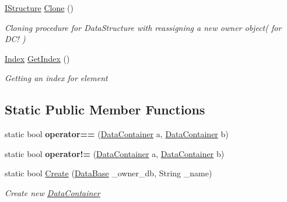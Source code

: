 \begin{DoxyCompactItemize}
\item 
\hyperlink{interface_dwarf_d_b_1_1_data_structures_1_1_i_structure}{I\+Structure} \hyperlink{class_dwarf_d_b_1_1_data_structures_1_1_data_container_a246c00add5642b9674339a0319bae617}{Clone} ()
\begin{DoxyCompactList}\small\item\em Cloning procedure for Data\+Structure with reassigning a new owner object( for D\+C! ) \end{DoxyCompactList}\item 
\hyperlink{class_dwarf_d_b_1_1_data_structures_1_1_index}{Index} \hyperlink{class_dwarf_d_b_1_1_data_structures_1_1_data_container_a195b9a3fcaa91d3240e07164c1d5c460}{Get\+Index} ()
\begin{DoxyCompactList}\small\item\em Getting an index for element \end{DoxyCompactList}\end{DoxyCompactItemize}
\subsection*{Static Public Member Functions}
\begin{DoxyCompactItemize}
\item 
\hypertarget{class_dwarf_d_b_1_1_data_structures_1_1_data_container_a7a47a45e62754b629dc06c57438a4eca}{static bool {\bfseries operator==} (\hyperlink{class_dwarf_d_b_1_1_data_structures_1_1_data_container}{Data\+Container} a, \hyperlink{class_dwarf_d_b_1_1_data_structures_1_1_data_container}{Data\+Container} b)}\label{class_dwarf_d_b_1_1_data_structures_1_1_data_container_a7a47a45e62754b629dc06c57438a4eca}

\item 
\hypertarget{class_dwarf_d_b_1_1_data_structures_1_1_data_container_aa59ee6235912ea37a590efe9a147b704}{static bool {\bfseries operator!=} (\hyperlink{class_dwarf_d_b_1_1_data_structures_1_1_data_container}{Data\+Container} a, \hyperlink{class_dwarf_d_b_1_1_data_structures_1_1_data_container}{Data\+Container} b)}\label{class_dwarf_d_b_1_1_data_structures_1_1_data_container_aa59ee6235912ea37a590efe9a147b704}

\item 
static bool \hyperlink{class_dwarf_d_b_1_1_data_structures_1_1_data_container_a57324435e4d7961b4b875588b9a86f3d}{Create} (\hyperlink{class_dwarf_d_b_1_1_data_structures_1_1_data_base}{Data\+Base} \+\_\+owner\+\_\+db, String \+\_\+name)
\begin{DoxyCompactList}\small\item\em Create new \hyperlink{class_dwarf_d_b_1_1_data_structures_1_1_data_container}{Data\+Container} \end{DoxyCompactList}\end{DoxyCompactItemize}
